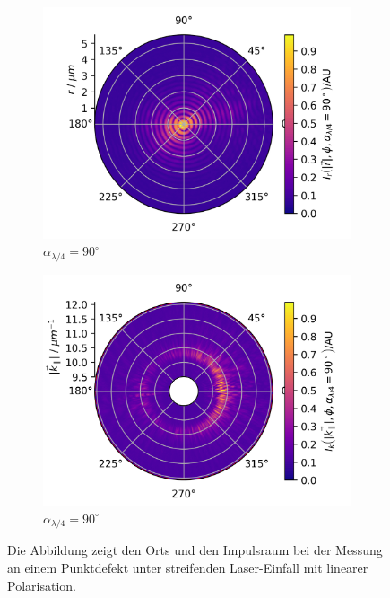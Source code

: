 \documentclass[titlepage,  ngerman]{article}
\begin{document}
\begin{figure}[h]
\begin{subfigure}{0.49\textwidth}
		\includegraphics[width=\textwidth]{figures/new/B_2_fp_90.png}
		\caption{$\alpha_{\lambda/4} = 90^\circ$}
	\end{subfigure}
	\begin{subfigure}{0.5\textwidth}
		\centering
		\includegraphics[width=\textwidth]{figures/new/B_2_bfp_90.png}
		\caption{$\alpha_{\lambda/4} = 90^\circ$}
	\end{subfigure}

	\caption[Orts- und Impulsraum Rohdaten bei linearer Polarisation]{Die Abbildung zeigt den Orts und den Impulsraum bei der Messung an einem Punktdefekt unter streifenden Laser-Einfall mit linearer Polarisation.}			
\end{figure}
\end{document}
